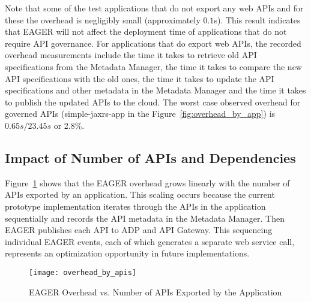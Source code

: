 Note that some of the test applications that do not export any web APIs and
for these the overhead
is negligibly small (approximately $0.1$s). 
This result indicates that EAGER
will not affect the deployment time of applications that do not require API
governance. 
For applications that do
export web APIs, the recorded overhead measurements include the time it takes to
retrieve old API specifications from the Metadata Manager, the time it takes
to compare the new API specifications with the old ones, the time it takes to
update the API specifications and other metadata in the Metadata Manager and
the time it takes to publish the updated APIs to the cloud.  
The worst case observed overhead for governed APIs (simple-jaxrs-app in the
Figure~\ref{fig:overhead_by_app}) is
$0.65s / 23.45s$ or 2.8\%.


\subsection{Impact of Number of APIs and Dependencies}

Figure~\ref{fig:overhead_by_apis} shows that the EAGER overhead grows linearly
with the number of APIs exported by an application.  This scaling occurs
because the current prototype implementation iterates through the APIs in the
application sequentially and records the API metadata in the Metadata Manager.
Then EAGER publishes each API to ADP and API Gateway. This sequencing
individual EAGER events, each of which generates a separate web service call,
represents an optimization opportunity in future implementations.

\begin{figure}
\centering
\texttt{[image: overhead\_by\_apis]}
\caption{EAGER Overhead vs. Number of APIs Exported by the Application}
\label{fig:overhead_by_apis}
\end{figure}


